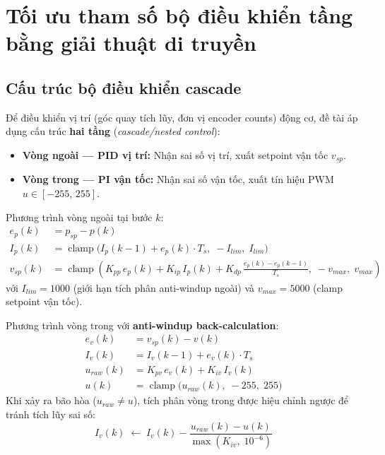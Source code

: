 \section{Tối ưu tham số bộ điều khiển tầng bằng giải thuật di truyền}
\label{sec:ga_optim}

\subsection{Cấu trúc bộ điều khiển cascade}

Để điều khiển vị trí (góc quay tích lũy, đơn vị encoder counts) động cơ,
đề tài áp dụng cấu trúc \textbf{hai tầng} (\textit{cascade/nested control}):

\begin{itemize}
    \item \textbf{Vòng ngoài — PID vị trí:} Nhận sai số vị trí, xuất
    setpoint vận tốc $v_{sp}$.
    \item \textbf{Vòng trong — PI vận tốc:} Nhận sai số vận tốc, xuất
    tín hiệu PWM $u \in [-255,\,255]$.
\end{itemize}

Phương trình vòng ngoài tại bước $k$:
\begin{align}
    e_p(k) &= p_{sp} - p(k)
    \label{eq:pos_err} \\
    I_p(k) &= \operatorname{clamp}\!\bigl(I_p(k{-}1) + e_p(k)\cdot T_s,\;
              -I_{lim},\; I_{lim}\bigr)
    \label{eq:pos_integrator} \\
    v_{sp}(k) &= \operatorname{clamp}\!\left(
                  K_{pp}\,e_p(k) + K_{ip}\,I_p(k)
                  + K_{dp}\,\frac{e_p(k)-e_p(k{-}1)}{T_s},\;
                  -v_{max},\; v_{max}\right)
    \label{eq:outer_pid}
\end{align}
với $I_{lim} = 1000$ (giới hạn tích phân anti-windup ngoài) và
$v_{max} = 5000$ (clamp setpoint vận tốc).

Phương trình vòng trong với \textbf{anti-windup back-calculation}:
\begin{align}
    e_v(k)      &= v_{sp}(k) - v(k)
    \label{eq:vel_err} \\
    I_v(k)      &= I_v(k{-}1) + e_v(k)\cdot T_s
    \label{eq:vel_int} \\
    u_{raw}(k)  &= K_{pv}\,e_v(k) + K_{iv}\,I_v(k)
    \label{eq:inner_pi} \\
    u(k)        &= \operatorname{clamp}\!\bigl(u_{raw}(k),\; -255,\; 255\bigr)
    \label{eq:pwm_sat}
\end{align}
Khi xảy ra bão hòa ($u_{raw} \neq u$), tích phân vòng trong được hiệu chỉnh
ngược để tránh tích lũy sai số:
\begin{equation}
    I_v(k) \;\leftarrow\; I_v(k)
            - \frac{u_{raw}(k) - u(k)}{\max(K_{iv},\;10^{-6})}
    \label{eq:anti_windup}
\end{equation}

